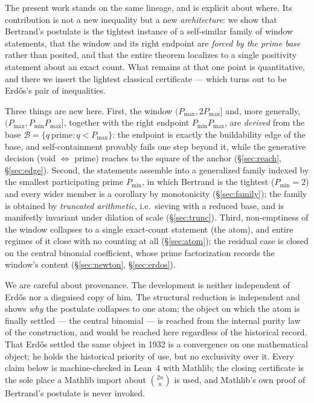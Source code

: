 \documentclass[11pt,a4paper]{amsart}
\theoremstyle{plain}
\theoremstyle{definition}
\theoremstyle{plain}
\theoremstyle{remark}
\begin{document}
The present work stands on the same lineage, and is explicit about where. Its
contribution is not a new inequality but a new \emph{architecture}: we show that
Bertrand's postulate is the tightest instance of a self-similar family of window
statements, that the window and its right endpoint are \emph{forced by the prime base}
rather than posited, and that the entire theorem localizes to a single positivity
statement about an exact count. What remains at that one point is quantitative, and there
we insert the lightest classical certificate --- which turns out to be Erd\H{o}s's pair of
inequalities.

Three things are new here. First, the window $(P_{\max},2P_{\max}]$ and, more generally,
$(P_{\max},P_{\min}P_{\max}]$, together with the right endpoint $P_{\min}P_{\max}$, are
\emph{derived} from the base $\mathcal{B}=\{q\ \text{prime}: q<P_{\max}\}$: the endpoint
is exactly the buildability edge of the base, and self-containment provably fails one step
beyond it, while the generative decision (void $\Leftrightarrow$ prime) reaches to the square
of the anchor (\S\ref{sec:reach}, \S\ref{sec:edge}). Second, the statements assemble into a
generalized family indexed by the smallest participating prime $P_{\min}$, in which
Bertrand is the tightest ($P_{\min}=2$) and every wider member is a corollary by
monotonicity (\S\ref{sec:family}); the family is obtained by \emph{truncated arithmetic},
i.e.\ sieving with a reduced base, and is manifestly invariant under dilation of scale
(\S\ref{sec:trunc}). Third, non-emptiness of the window collapses to a single exact-count
statement (the atom), and entire regimes of it close with no counting at all
(\S\ref{sec:atom}); the residual case is closed on the central binomial coefficient, whose
prime factorization records the window's content (\S\ref{sec:newton}, \S\ref{sec:erdos}).

We are careful about provenance. The development is neither independent of Erd\H{o}s nor a
disguised copy of him. The structural reduction is independent and shows \emph{why} the
postulate collapses to one atom; the object on which the atom is finally settled --- the
central binomial --- is reached from the internal purity law of the construction, and
would be reached here regardless of the historical record. That Erd\H{o}s settled the same
object in 1932 is a convergence on one mathematical object; he holds the historical
priority of use, but no exclusivity over it. Every claim below is machine-checked in
Lean~4 with Mathlib; the closing certificate is the sole place a Mathlib import about
$\binom{2n}{n}$ is used, and Mathlib's own proof of Bertrand's postulate is never
invoked.
\end{document}
